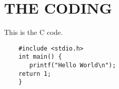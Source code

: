 \chapter{THE CODING}
\label{app:coding}

This is the C code.

\begin{verbatim}
    #include <stdio.h>
    int main() {
       printf("Hello World\n");
    return 1;
    }
\end{verbatim}